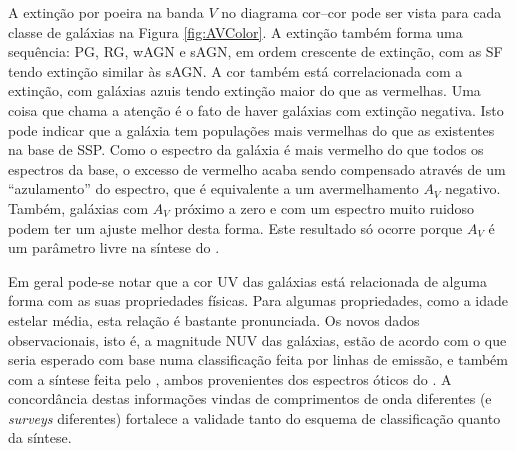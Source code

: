 A extinção por poeira na banda $V$ no diagrama cor--cor pode ser vista para cada
classe de galáxias na Figura \ref{fig:AVColor}. A extinção também forma uma
sequência: PG, RG, wAGN e sAGN, em ordem crescente de extinção, com as SF tendo
extinção similar às sAGN. A cor também está correlacionada com a extinção, com
galáxias azuis tendo extinção maior do que as vermelhas. Uma coisa que chama a
atenção é o fato de haver galáxias com extinção negativa. Isto pode indicar que
a galáxia tem populações mais vermelhas do que as existentes na base de SSP.
Como o espectro da galáxia é mais vermelho do que todos os espectros da base, o
excesso de vermelho acaba sendo compensado através de um ``azulamento'' do
espectro, que é equivalente a um avermelhamento $A_V$ negativo. Também, galáxias
com $A_V$ próximo a zero e com um espectro muito ruidoso podem ter um ajuste
melhor desta forma. Este resultado só ocorre porque $A_V$ é um parâmetro livre
na síntese do \starlight.

Em geral pode-se notar que a cor UV das galáxias está relacionada de alguma
forma com as suas propriedades físicas. Para algumas propriedades, como a idade
estelar média, esta relação é bastante pronunciada. Os novos dados
observacionais, isto é, a magnitude NUV das galáxias, estão de acordo com o que
seria esperado com base numa classificação feita por linhas de emissão, e também
com a síntese feita pelo \starlight, ambos provenientes dos espectros óticos do
\SDSS. A concordância destas informações vindas de comprimentos de onda
diferentes (e {\em surveys} diferentes) fortalece a validade tanto do esquema de
classificação quanto da síntese.

